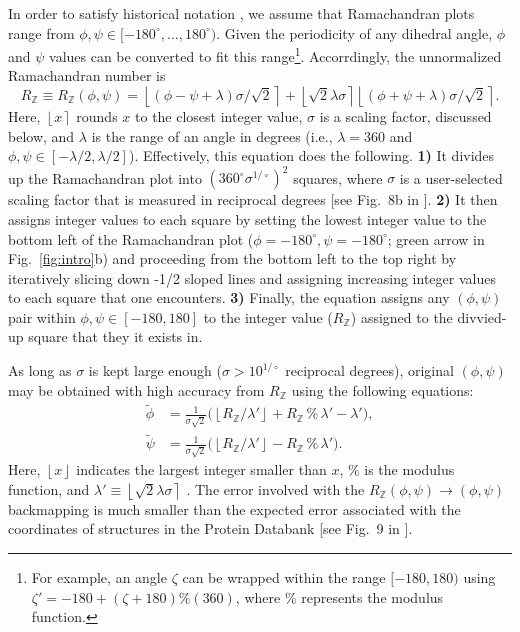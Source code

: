 \documentclass[fleqn,10pt]{wlpeerj} %
\newcommand{\floor}[1]{\left \lfloor #1 \right \rfloor}
\newcommand{\round}[1]{\left \lfloor #1 \right \rceil }
\newcommand{\Fig}[1]{Fig.~\ref{#1}}
\begin{document}
In order to satisfy historical notation \citep{Berg2006,Alberts2002,Laskowski1993,Laskowski2003}, we assume that Ramachandran plots range from $\phi,\psi \in [-180^\circ, \dots, 180^\circ)$. Given the periodicity of any dihedral angle, $\phi$ and $\psi$ values can be converted to fit this range\footnote{For example, an angle $\zeta$ can be wrapped within the range $[-180,180)$ using $\zeta' = - 180 + (\zeta + 180) \% (360)$, where $\%$ represents the modulus function.}. Accorrdingly, the unnormalized Ramachandran number \citep{MannigeKunduWhitelam2016} is
\begin{equation}
R_\mathbb{Z} \equiv R_\mathbb{Z}(\phi,\psi)  = \round{(\phi - \psi + \lambda)\sigma/\sqrt{2}} + \round{\sqrt{2} \lambda\sigma} \round{(\phi+\psi + \lambda)\sigma/\sqrt{2}}.
\label{ramachandran3}
\end{equation}
Here, $\round{x}$ rounds $x$ to the closest integer value, $\sigma$ is a scaling factor, discussed below, and $\lambda$ is the range of an angle in degrees (i.e., $\lambda=360$ and $\phi,\psi \in [-\lambda/2,\lambda/2]$). Effectively, this equation does the following. \textbf{1)} It divides up the Ramachandran plot into $(360^\circ \sigma^{1/\circ})^2$  squares, where $\sigma$ is a user-selected scaling factor that is measured in reciprocal degrees [see Fig.~8b in \cite{MannigeKunduWhitelam2016}]. \textbf{2)} It then assigns integer values to each square by setting the lowest integer value to the bottom left of the Ramachandran plot ($\phi=-180^\circ,\psi=-180^\circ$; green arrow in \Fig{fig:intro}b) and proceeding from the bottom left to the top right by iteratively slicing down -1/2 sloped lines and assigning increasing integer values to each square that one encounters. \textbf{3)} Finally, the equation assigns any $(\phi,\psi)$ pair within $\phi,\psi \in [-180,180]$ to the integer value ($R_\mathbb{Z}$) assigned to the divvied-up square that they it exists in. 

As long as $\sigma$ is kept large enough ($\sigma>10^{1/\circ}$ reciprocal degrees), original $(\phi,\psi)$ may be obtained with high accuracy from $R_\mathbb{Z}$ using the following equations:
\begin{align}
\tilde{\phi} &= \frac{1}{\sigma\sqrt{2}} \Big(\floor{R_\mathbb{Z} / \lambda'} + R_\mathbb{Z}\, \%\, \lambda' - \lambda' \Big), \label{backmap}\\
\tilde{\psi} &= \frac{1}{\sigma\sqrt{2}} \Big(\floor{R_\mathbb{Z} / \lambda'} - R_\mathbb{Z}\,  \%\,  \lambda' \Big).\label{backmap2}
\end{align}
Here, $\floor{x}$ indicates the largest integer smaller than $x$, $\%$ is the modulus function, and $\lambda' \equiv \round{\sqrt{2} \lambda\sigma}$ \citep{MannigeKunduWhitelam2016}. The error involved with the $R_\mathbb{Z}(\phi,\psi) \to (\phi,\psi)$ backmapping is much smaller than the expected error associated with the coordinates of structures in the Protein Databank [see Fig.~9 in \cite{MannigeKunduWhitelam2016}].
\end{document}
